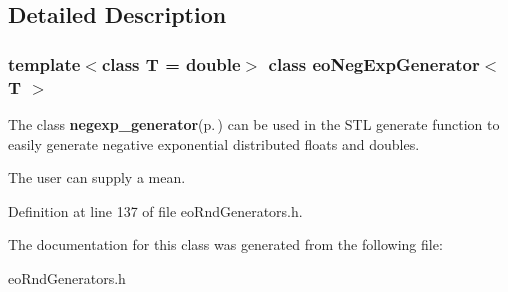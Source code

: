 \subsection{Detailed Description}
\subsubsection*{template$<$class T = double$>$ class eo\-Neg\-Exp\-Generator$<$ T $>$}

The class {\bf negexp\_\-generator}{\rm (p.\,\pageref{classnegexp__generator})} can be used in the STL generate function to easily generate negative exponential distributed floats and doubles. 

The user can supply a mean. 



Definition at line 137 of file eo\-Rnd\-Generators.h.

The documentation for this class was generated from the following file:\begin{CompactItemize}
\item 
eo\-Rnd\-Generators.h\end{CompactItemize}
